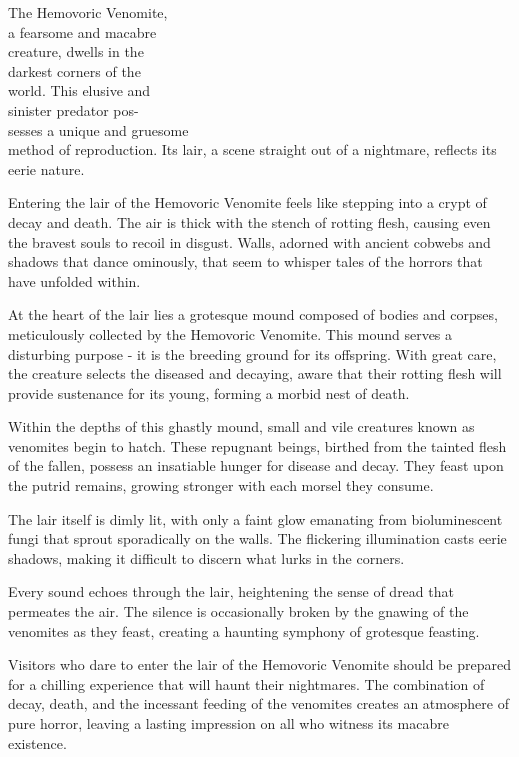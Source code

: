 \documentclass[letterpaper,openany,twoside,twocolumn]{book}
\begin{document}

The Hemovoric Venomite,\\a fearsome and macabre\\creature, dwells in the\\darkest corners of the\\world. This elusive and\\sinister predator pos-\\sesses a unique and gruesome\\method of reproduction. Its lair, a scene straight out of a nightmare, reflects its eerie nature.

Entering the lair of the Hemovoric Venomite feels like stepping into a crypt of decay and death. The air is thick with the stench of rotting flesh, causing even the bravest souls to recoil in disgust. Walls, adorned with ancient cobwebs and shadows that dance ominously, that seem to whisper tales of the horrors that have unfolded within.

At the heart of the lair lies a grotesque mound composed of bodies and corpses, meticulously collected by the Hemovoric Venomite. This mound serves a disturbing purpose - it is the breeding ground for its offspring. With great care, the creature selects the diseased and decaying, aware that their rotting flesh will provide sustenance for its young, forming a morbid nest of death.

Within the depths of this ghastly mound, small and vile creatures known as venomites begin to hatch. These repugnant beings, birthed from the tainted flesh of the fallen, possess an insatiable hunger for disease and decay. They feast upon the putrid remains, growing stronger with each morsel they consume.

The lair itself is dimly lit, with only a faint glow emanating from bioluminescent fungi that sprout sporadically on the walls. The flickering illumination casts eerie shadows, making it difficult to discern what lurks in the corners.

Every sound echoes through the lair, heightening the sense of dread that permeates the air. The silence is occasionally broken by the gnawing of the venomites as they feast, creating a haunting symphony of grotesque feasting.

Visitors who dare to enter the lair of the Hemovoric Venomite should be prepared for a chilling experience that will haunt their nightmares. The combination of decay, \blocktextlinebreak\hspace*{1.75cm}death, and the incessant feeding of the \blocktextlinebreak\hspace*{2.5cm}venomites creates an atmosphere of pure \blocktextlinebreak\hspace*{4cm} horror, leaving a lasting \blocktextlinebreak\hspace*{4.5cm} impression on all who witness \blocktextlinebreak\hspace*{5cm} its macabre existence. \blocktextlinebreak
\end{document}

